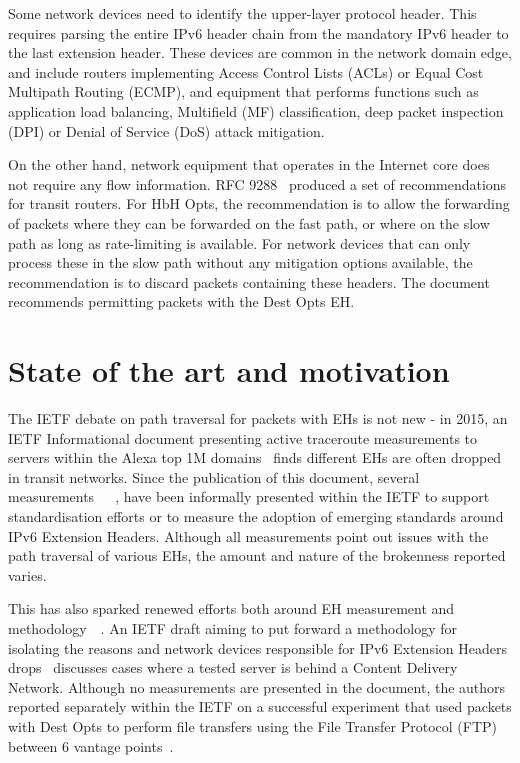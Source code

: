 \documentclass[conference]{IEEEtran}
\begin{document}
Some network devices need to identify the upper-layer protocol header. This requires parsing the entire IPv6 header chain from the mandatory IPv6 header to the last extension header. These devices are common in the network domain edge, and include routers implementing Access Control Lists (ACLs) or Equal Cost Multipath Routing (ECMP), and equipment that performs functions such as application load balancing, Multifield (MF) classification, deep packet inspection (DPI) or Denial of Service (DoS) attack mitigation.

On the other hand, network equipment that operates in the Internet core does not require any flow information. RFC 9288~\cite{rfc9288} produced a set of recommendations for transit routers. For HbH Opts, the recommendation is to allow the forwarding of packets where they can be forwarded on the fast path, or where on the slow path as long as rate-limiting is available. For network devices that can only process these in the slow path without any mitigation options available, the recommendation is to discard packets containing these headers. The document recommends permitting packets with the Dest Opts EH.



    

\section{State of the art and motivation}
\label{sec:motivation}

The IETF debate on path traversal for packets with EHs is not new - in 2015, an IETF Informational document presenting active traceroute measurements to servers within the Alexa top 1M domains~\cite{RFC7872} finds different EHs are often dropped in transit networks.
Since the publication of this document, several measurements~\cite{james}~\cite{nalini-iepg114}~\cite{apnic}, have been informally presented within the IETF to support standardisation efforts or to measure the adoption of emerging standards around IPv6 Extension Headers. Although all measurements point out issues with the path traversal of various EHs, the amount and nature of the brokenness reported varies.

This has also sparked renewed efforts both around EH measurement and methodology~\cite{james}~\cite{elkins-v6ops-eh-deepdive-fw-01}.
An IETF draft aiming to put forward a methodology for isolating the reasons and network devices responsible for IPv6 Extension Headers drops~\cite{elkins-v6ops-eh-deepdive-fw-01} discusses cases where a tested server is behind a Content Delivery Network. Although no measurements are presented in the document, the authors reported separately within the IETF on a successful experiment that used packets with Dest Opts to perform file transfers using the File Transfer Protocol (FTP) between 6 vantage points~\cite{nalini-iepg114}.
\end{document}
